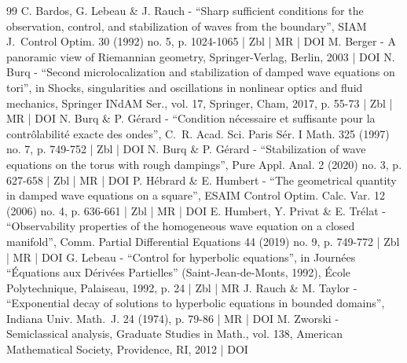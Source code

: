 \documentclass[10pt]{amsart}
\theoremstyle{definition}
\begin{document}
\begin{thebibliography}{99}
C. Bardos, G. Lebeau \& J. Rauch - “Sharp sufficient conditions for the observation, control, and stabilization of waves from the boundary”, SIAM J. Control Optim. 30 (1992) no. 5, p. 1024-1065 | Zbl | MR | DOI
M. Berger - A panoramic view of Riemannian geometry, Springer-Verlag, Berlin, 2003 | DOI
N. Burq - “Second microlocalization and stabilization of damped wave equations on tori”, in Shocks, singularities and oscillations in nonlinear optics and fluid mechanics, Springer INdAM Ser., vol. 17, Springer, Cham, 2017, p. 55-73 | Zbl | MR | DOI
N. Burq \& P. Gérard - “Condition nécessaire et suffisante pour la contrôlabilité exacte des ondes”, C. R. Acad. Sci. Paris Sér. I Math. 325 (1997) no. 7, p. 749-752 | Zbl | DOI
N. Burq \& P. Gérard - “Stabilization of wave equations on the torus with rough dampings”, Pure Appl. Anal. 2 (2020) no. 3, p. 627-658 | Zbl | MR | DOI
P. Hébrard \& E. Humbert - “The geometrical quantity in damped wave equations on a square”, ESAIM Control Optim. Calc. Var. 12 (2006) no. 4, p. 636-661 | Zbl | MR | DOI
E. Humbert, Y. Privat \& E. Trélat - “Observability properties of the homogeneous wave equation on a closed manifold”, Comm. Partial Differential Equations 44 (2019) no. 9, p. 749-772 | Zbl | MR | DOI
G. Lebeau - “Control for hyperbolic equations”, in Journées “Équations aux Dérivées Partielles” (Saint-Jean-de-Monts, 1992), École Polytechnique, Palaiseau, 1992, p. 24 | Zbl | MR
J. Rauch \& M. Taylor - “Exponential decay of solutions to hyperbolic equations in bounded domains”, Indiana Univ. Math. J. 24 (1974), p. 79-86 | MR | DOI
M. Zworski - Semiclassical analysis, Graduate Studies in Math., vol. 138, American Mathematical Society, Providence, RI, 2012 | DOI
\end{thebibliography}
\end{document}
